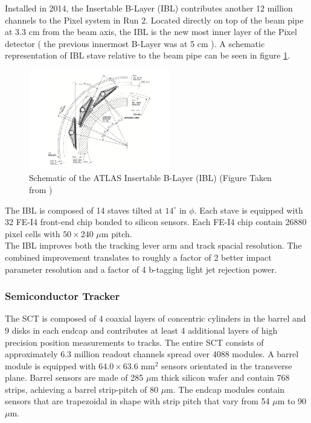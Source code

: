 \indent Installed in 2014, the Insertable B-Layer (IBL) contributes another 12 million channels to the Pixel system in Run 2.\cite{IBLOverview,IBL_TDR}   Located directly on top of the beam pipe at 3.3 cm from the beam axis, the IBL is the new most inner layer of the Pixel detector ( the previous innermost B-Layer was at 5 cm ). A schematic representation of IBL stave relative to the beam pipe can be seen in figure \ref{LHC:fig:IBL}. \\

\begin{figure}[h!]
\centering
\includegraphics[width=0.55\textwidth, angle=0]{figures/LHC_ATLAS/fig_ibl_layout_rev.png}
\caption{ Schematic of the ATLAS Insertable B-Layer (IBL) (Figure Taken from \cite{IBLOverview}) \label{LHC:fig:IBL}}
\end{figure}

\indent The IBL is composed of 14 staves tilted at $14^{\circ}$ in $\phi$.  Each stave is equipped with 32 FE-I4 front-end chip bonded to silicon sensors. Each FE-I4 chip contain 26880 pixel cells with $50 \times 240$ $\mu$m pitch.\\

\indent The IBL improves both the tracking lever arm and track spacial resolution.  The combined improvement translates to roughly a factor of 2 better impact parameter resolution and a factor of 4 b-tagging light jet rejection power. \\

\subsubsection*{ Semiconductor Tracker}

\indent The SCT is composed of 4 coaxial layers of concentric cylinders in the barrel and 9 disks in each endcap and contributes at least 4 additional layers of high precision position measurements to tracks.  The entire SCT consists of approximately 6.3 million readout channels spread over 4088 modules.  A barrel module is equipped with $64.0 \times 63.6$ mm$^2$ sensors orientated in the transverse plane.  Barrel sensors are made of 285 $\mu$m thick silicon wafer and contain 768 strips, achieving a barrel strip-pitch of 80 $\mu$m.  The endcap modules contain sensors that are trapezoidal in shape with strip pitch that vary from 54 $\mu$m to 90 $\mu$m.  \\


